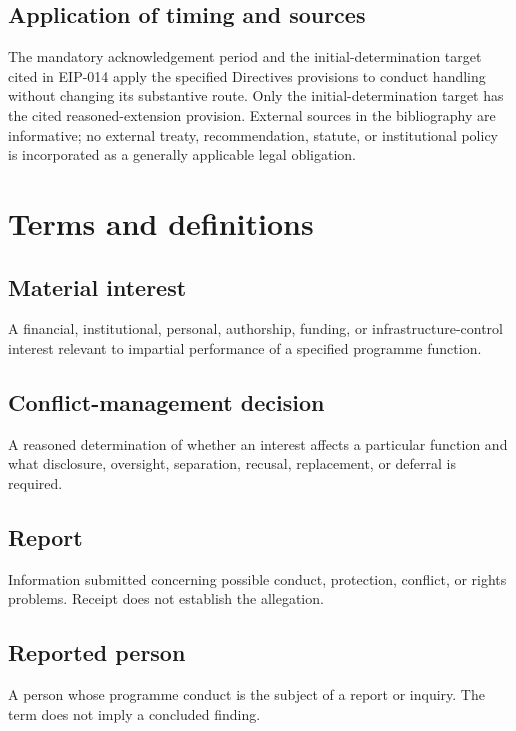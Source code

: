 \documentclass[11pt,a4paper]{article}
\begin{document}
\subsection{Application of timing and sources}
The mandatory acknowledgement period and the initial-determination target cited in EIP-014 apply the specified Directives provisions to conduct handling without changing its substantive route. Only the initial-determination target has the cited reasoned-extension provision. External sources in the bibliography are informative; no external treaty, recommendation, statute, or institutional policy is incorporated as a generally applicable legal obligation.


\section{Terms and definitions}
\subsection{Material interest}
A financial, institutional, personal, authorship, funding, or infrastructure-control interest relevant to impartial performance of a specified programme function.

\subsection{Conflict-management decision}
A reasoned determination of whether an interest affects a particular function and what disclosure, oversight, separation, recusal, replacement, or deferral is required.

\subsection{Report}
Information submitted concerning possible conduct, protection, conflict, or rights problems. Receipt does not establish the allegation.

\subsection{Reported person}
A person whose programme conduct is the subject of a report or inquiry. The term does not imply a concluded finding.
\end{document}
